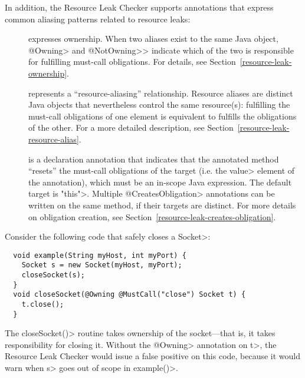 In addition, the Resource Leak Checker supports annotations that express common
aliasing patterns related to resource leaks:

\begin{description}

\item[]
\item[]
  expresses ownership.  When two aliases exist to the same Java object,
  \<@Owning> and \<@NotOwning>> indicate which of the two is responsible for
  fulfilling must-call obligations.  For details, see
  Section~\ref{resource-leak-ownership}.

\item[]
  represents a ``resource-aliasing'' relationship.  Resource aliases are
  distinct Java objects that nevertheless control the same resource(s):
  fulfilling the must-call obligations of one element is equivalent to
  fulfills the obligations of the other.  For a more detailed description,
  see Section~\ref{resource-leak-resource-alias}.

\item[]
  is a declaration annotation that indicates that the annotated method ``resets'' the must-call
  obligations of the target (i.e. the \<value> element of the annotation), which must
  be an in-scope Java expression. The default target is \<"this">. Multiple \<@CreatesObligation>
  annotations can be written on the same method, if their targets are distinct. For more details
  on obligation creation, see Section~\ref{resource-leak-creates-obligation}.

\end{description}



Consider the following code that safely closes a \<Socket>:

\begin{verbatim}
  void example(String myHost, int myPort) {
    Socket s = new Socket(myHost, myPort);
    closeSocket(s);
  }
  void closeSocket(@Owning @MustCall("close") Socket t) {
    t.close();
  }
\end{verbatim}

The \<closeSocket()> routine takes ownership of the socket---that is,
it takes responsibility for closing it. Without the \<@Owning>
annotation on \<t>, the Resource Leak Checker would issue a false positive on this
code, because it would warn when \<s>
goes out of scope in \<example()>.

